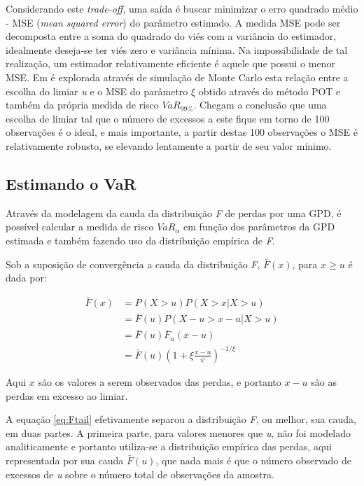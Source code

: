 \documentclass[review]{elsarticle}
\theoremstyle{definition}
\begin{document}
Considerando este \emph{trade-off}, uma saída é buscar minimizar o erro quadrado médio - MSE (\emph{mean squared error}) do parâmetro estimado. A medida MSE pode ser decomposta entre a soma do quadrado do viés com a variância do estimador, idealmente deseja-se ter viés zero e variância mínima. Na impossibilidade de tal realização, um estimador relativamente eficiente é aquele que possui o menor MSE. Em \cite[seção 5.2.5, p. ~139]{McNeil2015} é explorada através de simulação de Monte Carlo esta relação entre a escolha do limiar \emph{u} e o MSE do parâmetro $\xi$ obtido através do método POT e também da própria medida de risco $VaR_{99\%}$. Chegam a conclusão que uma escolha de limiar tal que o número de excessos a este fique em torno de 100 observações é o ideal, e mais importante, a partir destas 100 observações o MSE é relativamente robusto, se elevando lentamente a partir de seu valor mínimo.

\subsection{Estimando o VaR}
\label{sec:var}

Através da modelagem da cauda da distribuição \emph{F} de perdas por uma GPD, é possível calcular a medida de risco $VaR_\alpha$ em função dos parâmetros da GPD estimada e também fazendo uso da distribuição empírica de \emph{F}.

Sob a suposição de convergência a cauda da distribuição \emph{F}, $\bar{F}(x)$, para $x \geq u$ é dada por:

\begin{align}
\label{eq:Ftail}
\bar{F}(x) & = P(X>u)P(X>x|X>u) \nonumber \\
& = \bar{F}(u) P(X-u>x-u|X>u) \nonumber \\
& = \bar{F}(u)\bar{F}_u(x-u) \nonumber \\
& = \bar{F}(u)\left(1+\xi \frac{x-u}{\psi}\right)^{-1/\xi}
\end{align}

Aqui $x$ são os valores a serem observados das perdas, e portanto $x-u$ são as perdas em excesso ao limiar.

A equação \eqref{eq:Ftail} efetivamente separou a distribuição \emph{F}, ou melhor, sua cauda, em duas partes. A primeira parte, para valores menores que \emph{u}, não foi modelado analiticamente e portanto utiliza-se a distribuição empírica das perdas, aqui representada por sua cauda $\bar{F}(u)$, que nada mais é que o número observado de excessos de \emph{u} sobre o número total de observações da amostra.
\end{document}
